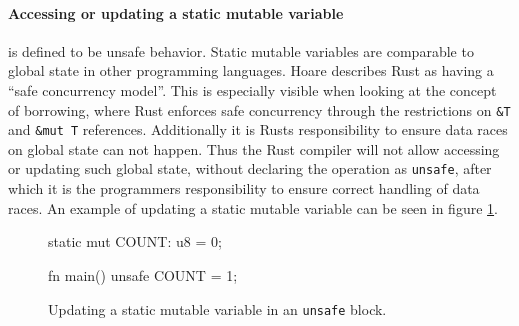 \documentclass[twocolumn]{article}
\begin{document}
\paragraph{Accessing or updating a static mutable variable} is defined to be unsafe behavior.
Static mutable variables are comparable to global state in other programming languages.
Hoare describes Rust as having a ``safe concurrency model''\cite{HoareInterview}.
This is especially visible when looking at the concept of borrowing, where Rust enforces safe concurrency through the restrictions on \texttt{&T} and \texttt{&mut T} references.
Additionally it is Rusts responsibility to ensure data races on global state can not happen.
Thus the Rust compiler will not allow accessing or updating such global state, without declaring the operation
as \texttt{unsafe}, after which it is the programmers responsibility to ensure correct handling of data races.
An example of updating a static mutable variable can be seen in figure \ref{unsafe-staticmut}.
\begin{figure}
\begin{rustcode}
static mut COUNT: u8 = 0;

fn main() {
    unsafe {
        COUNT = 1;
    }
}
\end{rustcode}
\vspace{-2em}
\caption{Updating a static mutable variable in an \texttt{unsafe} block.}
\label{unsafe-staticmut}
\end{figure}
\end{document}
